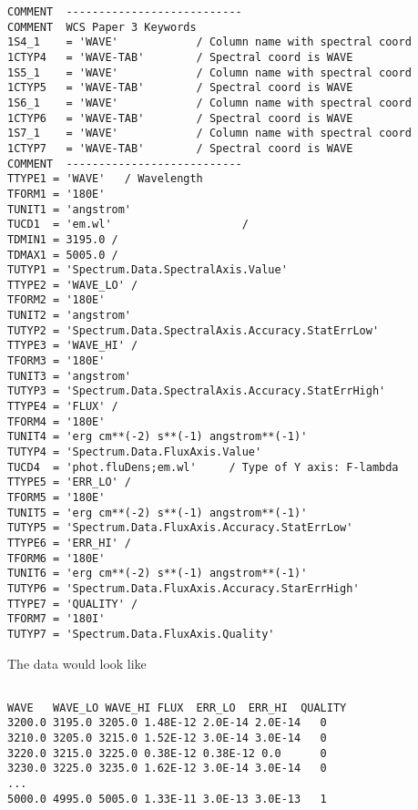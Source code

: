 {\begin{verbatim}
COMMENT  ---------------------------
COMMENT  WCS Paper 3 Keywords
1S4_1    = 'WAVE'            / Column name with spectral coord
1CTYP4   = 'WAVE-TAB'        / Spectral coord is WAVE 
1S5_1    = 'WAVE'            / Column name with spectral coord
1CTYP5   = 'WAVE-TAB'        / Spectral coord is WAVE 
1S6_1    = 'WAVE'            / Column name with spectral coord
1CTYP6   = 'WAVE-TAB'        / Spectral coord is WAVE 
1S7_1    = 'WAVE'            / Column name with spectral coord
1CTYP7   = 'WAVE-TAB'        / Spectral coord is WAVE 
COMMENT  ---------------------------
TTYPE1 = 'WAVE'   / Wavelength
TFORM1 = '180E'
TUNIT1 = 'angstrom'
TUCD1  = 'em.wl'                    /
TDMIN1 = 3195.0 /
TDMAX1 = 5005.0 /
TUTYP1 = 'Spectrum.Data.SpectralAxis.Value'
TTYPE2 = 'WAVE_LO' /
TFORM2 = '180E'
TUNIT2 = 'angstrom'
TUTYP2 = 'Spectrum.Data.SpectralAxis.Accuracy.StatErrLow'
TTYPE3 = 'WAVE_HI' /
TFORM3 = '180E'
TUNIT3 = 'angstrom'
TUTYP3 = 'Spectrum.Data.SpectralAxis.Accuracy.StatErrHigh'
TTYPE4 = 'FLUX' /
TFORM4 = '180E'
TUNIT4 = 'erg cm**(-2) s**(-1) angstrom**(-1)'
TUTYP4 = 'Spectrum.Data.FluxAxis.Value'
TUCD4  = 'phot.fluDens;em.wl'     / Type of Y axis: F-lambda
TTYPE5 = 'ERR_LO' /
TFORM5 = '180E'
TUNIT5 = 'erg cm**(-2) s**(-1) angstrom**(-1)'
TUTYP5 = 'Spectrum.Data.FluxAxis.Accuracy.StatErrLow'
TTYPE6 = 'ERR_HI' /
TFORM6 = '180E'
TUNIT6 = 'erg cm**(-2) s**(-1) angstrom**(-1)'
TUTYP6 = 'Spectrum.Data.FluxAxis.Accuracy.StarErrHigh'
TTYPE7 = 'QUALITY' /
TFORM7 = '180I'
TUTYP7 = 'Spectrum.Data.FluxAxis.Quality'
\end{verbatim}
}

The data would look like
{\small
\begin{verbatim}

WAVE   WAVE_LO WAVE_HI FLUX  ERR_LO  ERR_HI  QUALITY
3200.0 3195.0 3205.0 1.48E-12 2.0E-14 2.0E-14   0
3210.0 3205.0 3215.0 1.52E-12 3.0E-14 3.0E-14   0
3220.0 3215.0 3225.0 0.38E-12 0.38E-12 0.0      0                  
3230.0 3225.0 3235.0 1.62E-12 3.0E-14 3.0E-14   0
...
5000.0 4995.0 5005.0 1.33E-11 3.0E-13 3.0E-13   1
\end{verbatim}
}

%



